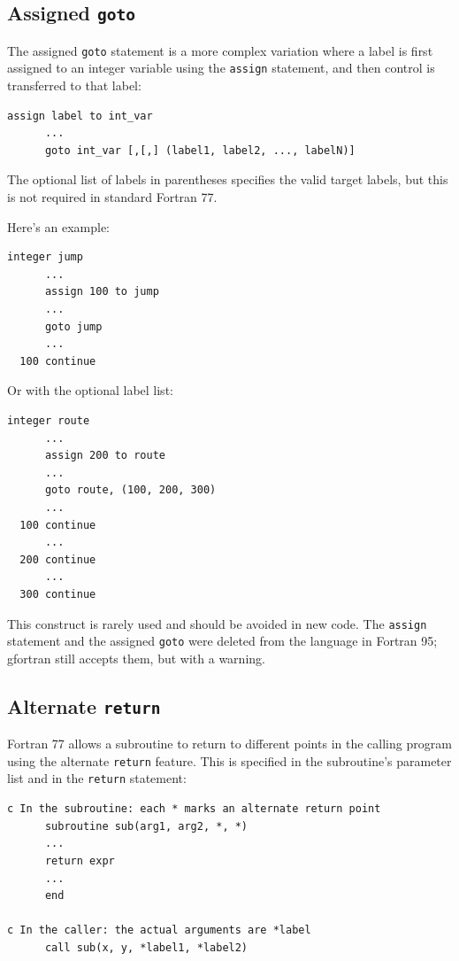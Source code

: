 \subsection{Assigned \texttt{goto}}

The assigned \texttt{goto} statement is a more complex variation where a label is first assigned to an integer variable using the \texttt{assign} statement, and then control is transferred to that label:

\begin{lstlisting}[style=fortran77]
      assign label to int_var
      ...
      goto int_var [,[,] (label1, label2, ..., labelN)]
\end{lstlisting}

The optional list of labels in parentheses specifies the valid target labels, but this is not required in standard Fortran 77.

Here's an example:

\begin{lstlisting}[style=fortran77]
      integer jump
      ...
      assign 100 to jump
      ...
      goto jump
      ...
  100 continue
\end{lstlisting}

Or with the optional label list:

\begin{lstlisting}[style=fortran77]
      integer route
      ...
      assign 200 to route
      ...
      goto route, (100, 200, 300)
      ...
  100 continue
      ...
  200 continue
      ...
  300 continue
\end{lstlisting}

This construct is rarely used and should be avoided in new code. The \texttt{assign} statement and the assigned \texttt{goto} were deleted from the language in Fortran 95; gfortran still accepts them, but with a warning.

\subsection{Alternate \texttt{return}}

Fortran 77 allows a subroutine to return to different points in the calling program using the alternate \texttt{return} feature. This is specified in the subroutine's parameter list and in the \texttt{return} statement:

\begin{lstlisting}[style=fortran77]
c In the subroutine: each * marks an alternate return point
      subroutine sub(arg1, arg2, *, *)
      ...
      return expr
      ...
      end

c In the caller: the actual arguments are *label
      call sub(x, y, *label1, *label2)
\end{lstlisting}

